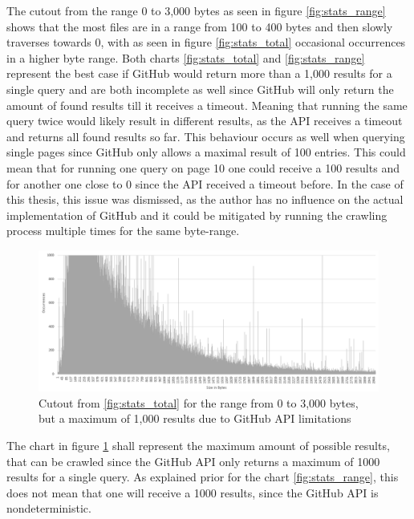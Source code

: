 The cutout from the range 0 to 3,000 bytes as seen in figure \ref{fig:stats_range} shows that the most files are in a range from 100 to 400 bytes and then slowly traverses towards 0, with as seen in figure \ref{fig:stats_total} occasional occurrences in a higher byte range. Both charts \ref{fig:stats_total} and \ref{fig:stats_range} represent the best case if GitHub would return more than a 1,000 results for a single query and are both incomplete as well since GitHub will only return the amount of found results till it receives a timeout. Meaning that running the same query twice would likely result in different results, as the API receives a timeout and returns all found results so far. This behaviour occurs as well when querying single pages since GitHub only allows a maximal result of 100 entries. This could mean that for running one query on page 10 one could receive a 100 results and for another one close to 0 since the API received a timeout before. In the case of this thesis, this issue was dismissed, as the author has no influence on the actual implementation of GitHub and it could be mitigated by running the crawling process multiple times for the same byte-range.

\begin{figure}[H]
    \centering
    \includegraphics[scale=0.5]{graphics/stats_range_max_possible_bw.png}
    \caption{Cutout from \ref{fig:stats_total} for the range from 0 to 3,000 bytes, but a maximum of 1,000 results due to GitHub API limitations }
    \label{fig:stats_max_possible}
\end{figure}

The chart in figure \ref{fig:stats_max_possible} shall represent the maximum amount of possible results, that can be crawled since the GitHub API only returns a maximum of 1000 results for a single query. As explained prior for the chart \ref{fig:stats_range}, this does not mean that one will receive a 1000 results, since the GitHub API is nondeterministic.

